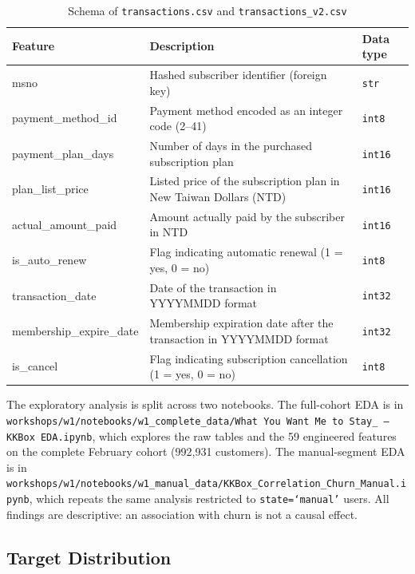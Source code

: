 \documentclass{article}
\begin{document}
\begin{table}[H]
\centering
\renewcommand{\arraystretch}{1.3}
\begin{tabularx}{\textwidth}{|l|X|l|}
\hline
\textbf{Feature} & \textbf{Description} & \textbf{Data type} \\ \hline
msno                     & Hashed subscriber identifier (foreign key) & \texttt{str} \\ \hline
payment\_method\_id      & Payment method encoded as an integer code (2--41) & \texttt{int8} \\ \hline
payment\_plan\_days      & Number of days in the purchased subscription plan & \texttt{int16} \\ \hline
plan\_list\_price        & Listed price of the subscription plan in New Taiwan Dollars (NTD) & \texttt{int16} \\ \hline
actual\_amount\_paid     & Amount actually paid by the subscriber in NTD & \texttt{int16} \\ \hline
is\_auto\_renew          & Flag indicating automatic renewal (1 = yes, 0 = no) & \texttt{int8} \\ \hline
transaction\_date        & Date of the transaction in YYYYMMDD format & \texttt{int32} \\ \hline
membership\_expire\_date & Membership expiration date after the transaction in YYYYMMDD format & \texttt{int32} \\ \hline
is\_cancel               & Flag indicating subscription cancellation (1 = yes, 0 = no) & \texttt{int8} \\ \hline
\end{tabularx}
\caption{Schema of \texttt{transactions.csv} and \texttt{transactions\_v2.csv}}
\label{tab:schema_transactions}
\end{table}

The exploratory analysis is split across two notebooks. The full-cohort EDA is in \texttt{workshops/w1/notebooks/w1\_complete\_data/What You Want Me to Stay\_ -- KKBox EDA.ipynb}, which explores the raw tables and the 59 engineered features on the complete February cohort (992{,}931 customers). The manual-segment EDA is in \texttt{workshops/w1/notebooks/w1\_manual\_data/KKBox\_Correlation\_Churn\_Manual.ipynb}, which repeats the same analysis restricted to \texttt{state=`manual'} users. All findings are descriptive: an association with churn is not a causal effect.

\subsection{Target Distribution}
\end{document}
